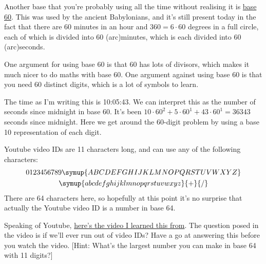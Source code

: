 \documentclass[fleqn]{LectureClass/LectureClass}
\begin{document}
    \begin{app}{}{}
        Another base that you're probably using all the time without realising it is \href{https://en.wikipedia.org/wiki/Sexagesimal}{base 60}.
        This was used by the ancient Babylonians, and it's still present today in the fact that there are 60 minutes in an hour and \(360 = 6 \cdot 60\) degrees in a full circle, each of which is divided into 60 (arc)minutes, which is each divided into 60 (arc)seconds.
        
        One argument for using base 60 is that 60 has lots of divisors, which makes it much nicer to do maths with base 60.
        One argument against using base 60 is that you need 60 distinct digits, which is a lot of symbols to learn.
        
        The time as I'm writing this is 10:05:43.
        We can interpret this as the number of seconds since midnight in base 60.
        It's been \(10 \cdot 60^2 + 5 \cdot 60^1 + 43 \cdot 60^1 = 36343\) seconds since midnight.
        Here we get around the 60-digit problem by using a base 10 representation of each digit.
    \end{app}
    
    \begin{app}{}{}
        Youtube video IDs are 11 characters long, and can use any of the following characters:
        \begin{multline}
            0123456789\symup{ABCDEFGHIJKLMNOPQRSTUVWXYZ}\\
            \symup{abcdefghijklmnopqrstuvwxyz}{+}{/}
        \end{multline}
        There are 64 characters here, so hopefully at this point it's no surprise that actually the Youtube video ID is a number in base 64.
        
        Speaking of Youtube, \href{https://www.youtube.com/watch?v=gocwRvLhDf8}{here's the video I learned this from}.
        The question posed in the video is if we'll ever run out of video IDs?
        Have a go at answering this before you watch the video.
        [Hint: What's the largest number you can make in base 64 with 11 digits?]
    \end{app}
\end{document}
